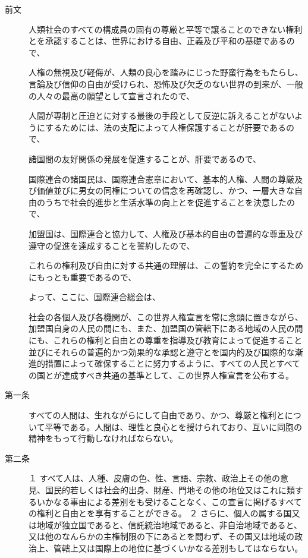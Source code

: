 \begin{description}

\item [前文]

人類社会のすべての構成員の固有の尊厳と平等で譲ることのできない権利とを承認することは、世界における自由、正義及び平和の基礎であるので、

人権の無視及び軽侮が、人類の良心を踏みにじった野蛮行為をもたらし、言論及び信仰の自由が受けられ、恐怖及び欠乏のない世界の到来が、一般の人々の最高の願望として宣言されたので、

人間が専制と圧迫とに対する最後の手段として反逆に訴えることがないようにするためには、法の支配によって人権保護することが肝要であるので、

諸国間の友好関係の発展を促進することが、肝要であるので、

国際連合の諸国民は、国際連合憲章において、基本的人権、人間の尊厳及び価値並びに男女の同権についての信念を再確認し、かつ、一層大きな自由のうちで社会的進歩と生活水準の向上とを促進することを決意したので、

加盟国は、国際連合と協力して、人権及び基本的自由の普遍的な尊重及び遵守の促進を達成することを誓約したので、

これらの権利及び自由に対する共通の理解は、この誓約を完全にするためにもっとも重要であるので、

よって、ここに、国際連合総会は、

社会の各個人及び各機関が、この世界人権宣言を常に念頭に置きながら、加盟国自身の人民の間にも、また、加盟国の管轄下にある地域の人民の間にも、これらの権利と自由との尊重を指導及び教育によって促進すること並びにそれらの普遍的かつ効果的な承認と遵守とを国内的及び国際的な漸進的措置によって確保することに努力するように、すべての人民とすべての国とが達成すべき共通の基準として、この世界人権宣言を公布する。

\item [第一条]

すべての人間は、生れながらにして自由であり、かつ、尊厳と権利とについて平等である。人間は、理性と良心とを授けられており、互いに同胞の精神をもって行動しなければならない。

\item[第二条]


\noindent{}１ すべて人は、人種、皮膚の色、性、言語、宗教、政治上その他の意見、国民的若しくは社会的出身、財産、門地その他の地位又はこれに類するいかなる事由による差別をも受けることなく、この宣言に掲げるすべての権利と自由とを享有することができる。
\noindent{}２ さらに、個人の属する国又は地域が独立国であると、信託統治地域であると、非自治地域であると、又は他のなんらかの主権制限の下にあるとを問わず、その国又は地域の政治上、管轄上又は国際上の地位に基づくいかなる差別もしてはならない。


\end{description}

